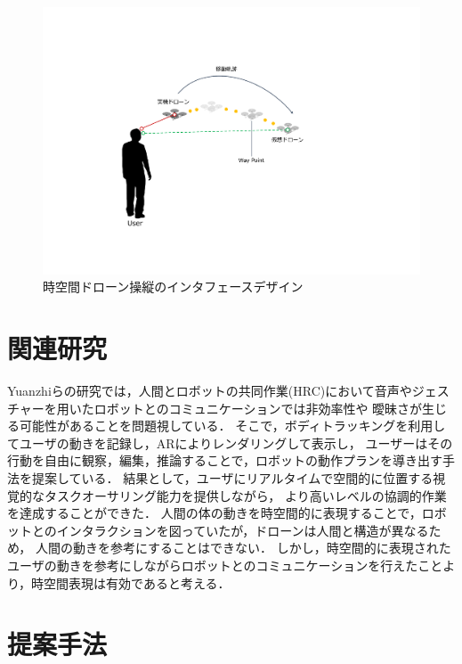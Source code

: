 \documentclass[a4paper,10pt,twocolumn,uplatex]{jsarticle}
\begin{document}
\begin{figure}[!tb]
  \centering
  \includegraphics[width=\linewidth]{img/movement.pdf}
  \caption{時空間ドローン操縦のインタフェースデザイン}
  \label{fig:movement}
\end{figure}


\section{関連研究}\label{discussion}
Yuanzhiらの研究では，人間とロボットの共同作業(HRC)において音声やジェスチャーを用いたロボットとのコミュニケーションでは非効率性や
曖昧さが生じる可能性があることを問題視している．
そこで，ボディトラッキングを利用してユーザの動きを記録し，ARによりレンダリングして表示し，
ユーザーはその行動を自由に観察，編集，推論することで，ロボットの動作プランを導き出す手法を提案している\cite{time-space}．
結果として，ユーザにリアルタイムで空間的に位置する視覚的なタスクオーサリング能力を提供しながら，
より高いレベルの協調的作業を達成することができた．
人間の体の動きを時空間的に表現することで，ロボットとのインタラクションを図っていたが，ドローンは人間と構造が異なるため，
人間の動きを参考にすることはできない．
しかし，時空間的に表現されたユーザの動きを参考にしながらロボットとのコミュニケーションを行えたことより，時空間表現は有効であると考える．


\section{提案手法}\label{discussion}
\end{document}
